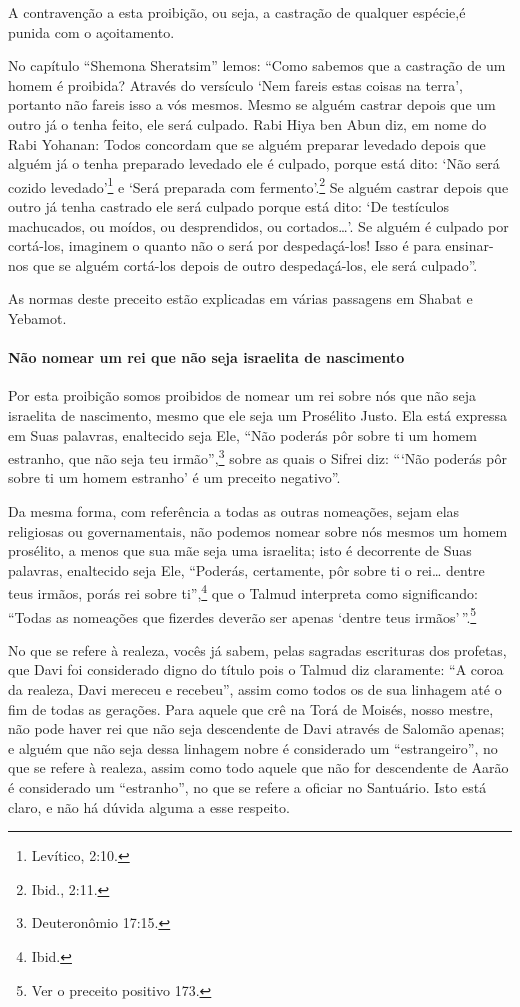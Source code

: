A contravenção a esta proibição, ou seja, a castração de qualquer
espécie,é punida com o açoitamento.

No capítulo ``Shemona Sheratsim'' lemos: ``Como sabemos que a castração
de um homem é proibida? Através do versículo `Nem fareis estas coisas na
terra', portanto não fareis isso a vós mesmos. Mesmo se alguém castrar
depois que um outro já o tenha feito, ele será culpado. Rabi Hiya ben
Abun diz, em nome do Rabi Yohanan: Todos concordam que se alguém
preparar levedado depois que alguém já o tenha preparado levedado ele é
culpado, porque está dito: `Não será cozido levedado'\footnote{Levítico, 2:10.} e
`Será preparada com fermento'.\footnote{Ibid., 2:11.} Se alguém castrar depois
que outro já tenha castrado ele será culpado porque está dito: `De
testículos machucados, ou moídos, ou desprendidos, ou cortados\ldots{}'. Se
alguém é culpado por cortá-los, imaginem o quanto não o será por
despedaçá-los! Isso é para ensinar-nos que se alguém cortá-los depois de
outro despedaçá-los, ele será culpado''.

As normas deste preceito estão explicadas em várias passagens em Shabat
e Yebamot.

\paragraph{Não nomear um rei que não seja israelita de nascimento}

Por esta proibição somos proibidos de nomear um rei sobre nós que não
seja israelita de nascimento, mesmo que ele seja um Prosélito Justo. Ela
está expressa em Suas palavras, enaltecido seja Ele, ``Não poderás pôr
sobre ti um homem estranho, que não seja teu irmão'',\footnote{Deuteronômio
17:15.} sobre as quais o Sifrei diz: ```Não poderás pôr sobre ti um homem estranho' é
um preceito negativo''.

Da mesma forma, com referência a todas as outras nomeações, sejam elas
religiosas ou governamentais, não podemos nomear sobre nós mesmos um
homem prosélito, a menos que sua mãe seja uma israelita; isto é
decorrente de Suas palavras, enaltecido seja Ele, ``Poderás,
certamente, pôr sobre ti o rei\ldots{} dentre teus irmãos, porás rei sobre
ti'',\footnote{Ibid.} que o Talmud interpreta como significando: ``Todas as
nomeações que fizerdes deverão ser apenas `dentre teus
irmãos'\,''.\footnote{Ver o preceito positivo 173.}

No que se refere à realeza, vocês já sabem, pelas sagradas escrituras
dos profetas, que Davi foi considerado digno do título pois o Talmud diz
claramente: ``A coroa da realeza, Davi mereceu e recebeu'', assim como
todos os de sua linhagem até o fim de todas as gerações. Para aquele que
crê na Torá de Moisés, nosso mestre, não pode haver rei que não seja
descendente de Davi através de Salomão apenas; e alguém que não seja
dessa linhagem nobre é considerado um ``estrangeiro'', no que se refere
à realeza, assim como todo aquele que não for descendente de Aarão é
considerado um ``estranho'', no que se refere a oficiar no Santuário.
Isto está claro, e não há dúvida alguma a esse respeito.

